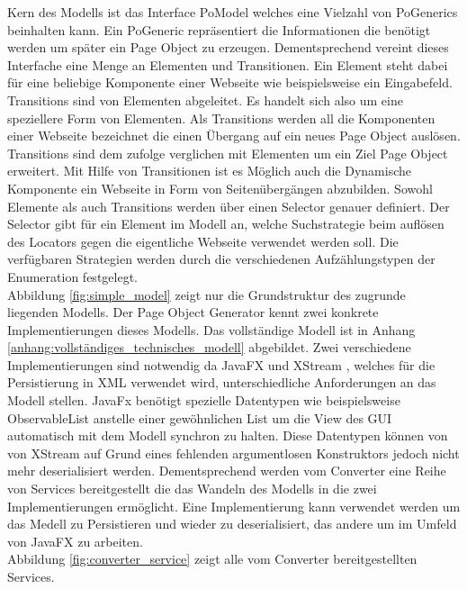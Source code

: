 Kern des Modells ist das Interface PoModel welches eine Vielzahl von PoGenerics beinhalten kann. Ein PoGeneric repräsentiert die Informationen die benötigt werden um später ein Page Object zu erzeugen. Dementsprechend vereint dieses Interfache eine Menge an Elementen und Transitionen.
Ein Element steht dabei für eine beliebige Komponente einer Webseite wie beispielsweise ein Eingabefeld.
Transitions sind von Elementen abgeleitet. Es handelt sich also um eine speziellere Form von Elementen. Als Transitions werden all die Komponenten einer Webseite bezeichnet die einen Übergang auf ein neues Page Object auslösen. Transitions sind dem zufolge verglichen mit Elementen um ein Ziel Page Object erweitert.
Mit Hilfe von Transitionen ist es Möglich auch die Dynamische Komponente ein Webseite in Form von Seitenübergängen abzubilden.
Sowohl Elemente als auch Transitions werden über einen Selector genauer definiert.
Der Selector gibt für ein Element im Modell an, welche Suchstrategie beim auflösen des Locators gegen die eigentliche Webseite verwendet werden soll.
Die verfügbaren Strategien werden durch die verschiedenen Aufzählungstypen der Enumeration festgelegt.\\
Abbildung \ref{fig:simple_model} zeigt nur die Grundstruktur des zugrunde liegenden Modells. Der Page Object Generator kennt zwei konkrete Implementierungen dieses Modells. Das vollständige Modell ist in Anhang \ref{anhang:vollständiges_technisches_modell} abgebildet.
Zwei verschiedene Implementierungen sind notwendig da JavaFX und XStream \cite{joe_walnes_xstream_2015}, welches für die Persistierung in XML verwendet wird, unterschiedliche Anforderungen an das Modell stellen. JavaFx benötigt spezielle Datentypen wie beispielsweise ObservableList anstelle einer gewöhnlichen List um die View des GUI automatisch mit dem Modell synchron zu halten. Diese Datentypen können von von XStream auf Grund eines fehlenden argumentlosen Konstruktors jedoch nicht mehr deserialisiert werden.
Dementsprechend werden vom Converter eine Reihe von Services bereitgestellt die das Wandeln des Modells in die zwei Implementierungen ermöglicht. Eine Implementierung kann verwendet werden um das Medell zu Persistieren und wieder zu deserialisiert, das andere um im Umfeld von JavaFX zu arbeiten.\\
Abbildung \ref{fig:converter_service} zeigt alle vom Converter bereitgestellten Services. 

